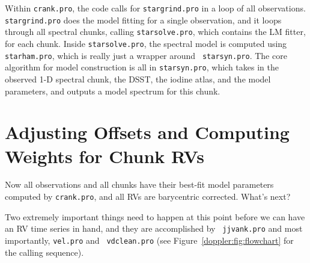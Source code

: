 Within {\tt crank.pro}, the code calls for {\tt stargrind.pro} in a
loop of all observations. {\tt stargrind.pro} does the model fitting
for a single observation, and it loops through all spectral chunks,
calling {\tt starsolve.pro}, which contains the LM fitter, for each
chunk. Inside {\tt starsolve.pro}, the spectral model is computed
using {\tt starham.pro}, which is really just a wrapper around {\tt
  starsyn.pro}. The core algorithm for model construction is all in
{\tt starsyn.pro}, which takes in the observed 1-D spectral chunk, the
DSST, the iodine atlas, and the model parameters, and outputs a model
spectrum for this chunk. 



\section{Adjusting Offsets and Computing Weights for Chunk RVs}

Now all observations and all chunks have their best-fit model parameters
computed by {\tt crank.pro}, and all RVs are barycentric
corrected. What's next?

Two extremely important things need to happen at this point before we
can have an RV time series in hand, and they are accomplished by {\tt
  jjvank.pro} and most importantly, {\tt vel.pro} and {\tt
  vdclean.pro} (see Figure~\ref{doppler:fig:flowchart} for the calling
sequence).

